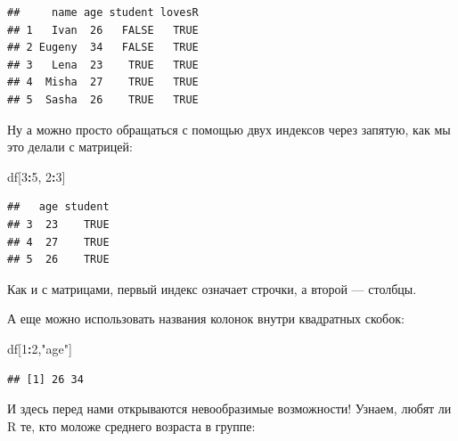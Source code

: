 \documentclass[]{book}
\newenvironment{Shaded}{\begin{snugshade}}{\end{snugshade}}
\newcommand{\KeywordTok}[1]{\textcolor[rgb]{0.13,0.29,0.53}{\textbf{#1}}}
\newcommand{\DecValTok}[1]{\textcolor[rgb]{0.00,0.00,0.81}{#1}}
\newcommand{\StringTok}[1]{\textcolor[rgb]{0.31,0.60,0.02}{#1}}
\newcommand{\CommentTok}[1]{\textcolor[rgb]{0.56,0.35,0.01}{\textit{#1}}}
\newcommand{\OperatorTok}[1]{\textcolor[rgb]{0.81,0.36,0.00}{\textbf{#1}}}
\newcommand{\NormalTok}[1]{#1}
\begin{document}
\begin{Shaded}
\end{Shaded}

\begin{verbatim}
##     name age student lovesR
## 1   Ivan  26   FALSE   TRUE
## 2 Eugeny  34   FALSE   TRUE
## 3   Lena  23    TRUE   TRUE
## 4  Misha  27    TRUE   TRUE
## 5  Sasha  26    TRUE   TRUE
\end{verbatim}

Ну а можно просто обращаться с помощью двух индексов через запятую, как
мы это делали с матрицей:

\begin{Shaded}
\begin{Highlighting}[]
\NormalTok{df[}\DecValTok{3}\OperatorTok{:}\DecValTok{5}\NormalTok{, }\DecValTok{2}\OperatorTok{:}\DecValTok{3}\NormalTok{]}
\end{Highlighting}
\end{Shaded}

\begin{verbatim}
##   age student
## 3  23    TRUE
## 4  27    TRUE
## 5  26    TRUE
\end{verbatim}

Как и с матрицами, первый индекс означает строчки, а второй --- столбцы.

А еще можно использовать названия колонок внутри квадратных скобок:

\begin{Shaded}
\begin{Highlighting}[]
\NormalTok{df[}\DecValTok{1}\OperatorTok{:}\DecValTok{2}\NormalTok{,}\StringTok{"age"}\NormalTok{]}
\end{Highlighting}
\end{Shaded}

\begin{verbatim}
## [1] 26 34
\end{verbatim}

И здесь перед нами открываются невообразимые возможности! Узнаем, любят
ли R те, кто моложе среднего возраста в группе:

\begin{Shaded}
\end{Shaded}
\end{document}
